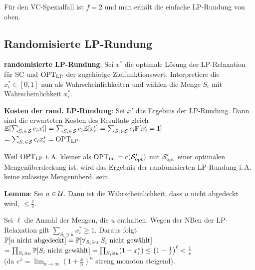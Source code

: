 \linie

Für den VC-Spezialfall ist $f = 2$ und man erhält die einfache LP-Rundung von oben.

\subsection{%
    Randomisierte LP-Rundung%
}

\textbf{randomisierte LP-Rundung}:
Sei $x^\ast$ die optimale Lösung der LP-Relaxation für SC und
$\text{OPT}_\text{LP}$ der zugehörige Zielfunktionswert.
Interpretiere die $x_i^\ast \in [0, 1]$ nun als Wahrscheinlichkeiten
und wählen die Menge $S_i$ mit Wahrscheinlichkeit $x_i^\ast$.

\linie

\textbf{Kosten der rand. LP-Rundung}:
Sei $x'$ das Ergebnis der LP-Rundung.
Dann sind die erwarteten Kosten des Resultats gleich
$\mathbb{E}[\sum_{S_i \in \mathcal{S}} c_i x_i'] = \sum_{S_i \in \mathcal{S}} c_i \mathbb{E}[x_i'] =
\sum_{S_i \in \mathcal{S}} c_i \mathbb{P}[x_i' = 1]$\\
$= \sum_{S_i \in \mathcal{S}} c_i x_i^\ast = \text{OPT}_\text{LP}$.

Weil $\text{OPT}_\text{LP}$ i.\,A. kleiner als $\text{OPT}_\text{int} = c(\mathcal{S}'_{\text{opt}})$ mit $\mathcal{S}'_{\text{opt}}$
einer optimalen Mengenüberdeckung
ist, wird das Ergebnis der randomisierten LP-Rundung i.\,A. keine zulässige Mengenüberd. sein.

\textbf{Lemma}:
Sei $u \in \mathcal{U}$.
Dann ist die Wahrscheinlichkeit, dass $u$ nicht abgedeckt wird, $\le \frac{1}{e}$.

\begin{Beweis}
    Sei $\ell$ die Anzahl der Mengen, die $u$ enthalten.
    Wegen der NBen der LP-Relaxation gilt
    $\sum_{S_i \ni u} x_i^\ast \ge 1$.
    Daraus folgt
    $\mathbb{P}[\text{$u$ nicht abgedeckt}]
    = \mathbb{P}[\forall_{S_i \ni u}\; \text{$S_i$ nicht gewählt}]$\\
    $= \prod_{S_i \ni u} \mathbb{P}[\text{$S_i$ nicht gewählt}]
    = \prod_{S_i \ni u} (1 - x_i^\ast)
    \le \left(1 - \frac{1}{\ell}\right)^\ell
    < \frac{1}{e}$\\
    (da $e^x = \lim_{n \to \infty} \left(1 + \frac{x}{n}\right)^n$ streng monoton steigend).
\end{Beweis}

\linie

